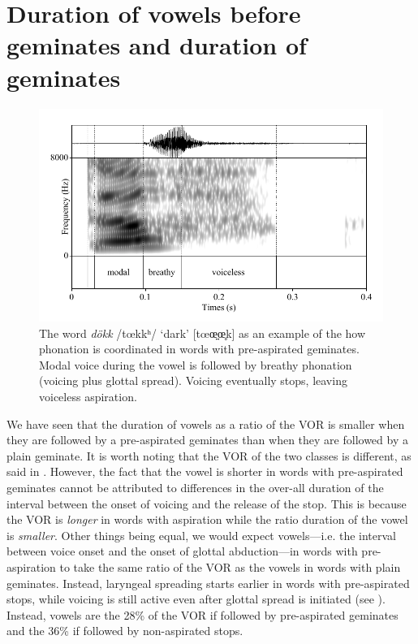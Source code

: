 \documentclass[11pt,a4paper,oneside,openany]{memoir}\usepackage[]{graphicx}\usepackage[]{color}
\begin{document}
\section{Duration of vowels before geminates and duration of geminates}

\begin{figure}
\centering
\includegraphics[width=\textwidth]{dokk}
\caption[An example of the how phonation is coordinated in words with pre-aspirated geminates.]{The word \textit{dökk} /tœkkʰ/ `dark' [tœœ̤̤œ̥k] as an example of the how phonation is coordinated in words with pre-aspirated geminates.
Modal voice during the vowel is followed by breathy phonation (voicing plus glottal spread).
Voicing eventually stops, leaving voiceless aspiration.
}
\label{f:glottal}
\end{figure}

We have seen that the duration of vowels as a ratio of the VOR is smaller when they are followed by a pre-aspirated geminates than when they are followed by a plain geminate.
It is worth noting that the VOR of the two classes is different, as said in .
However, the fact that the vowel is shorter in words with pre-aspirated geminates cannot be attributed to differences in the over-all duration of the interval between the onset of voicing and the release of the stop.
This is because the VOR is \textit{longer} in words with aspiration while the ratio duration of the vowel is \textit{smaller}.
Other things being equal, we would expect vowels---i.e. the interval between voice onset and the onset of glottal abduction---in words with pre-aspiration to take the same ratio of the VOR as the vowels in words with plain geminates.
Instead, laryngeal spreading starts earlier in words with pre-aspirated stops, while voicing is still active even after glottal spread is initiated (see ).
Instead, vowels are the 28\% of the VOR if followed by pre-aspirated geminates and the 36\% if followed by non-aspirated stops.
\end{document}
